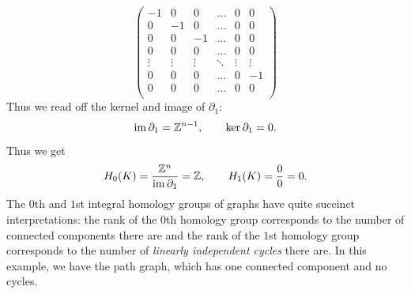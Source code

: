\begin{example}
\begin{enumerate}
\[\begin{pmatrix}
                      -1     & 0      & 0      & \ldots & 0      & 0      \\
                      0      & -1     & 0      & \ldots & 0      & 0      \\
                      0      & 0      & -1     & \ldots & 0      & 0      \\
                      0      & 0      & 0      & \ldots & 0      & 0      \\
                      \vdots & \vdots & \vdots & \ddots & \vdots & \vdots \\
                      0      & 0      & 0      & \ldots & 0      & -1     \\
                      0      & 0      & 0      & \ldots & 0      & 0      \\
                  \end{pmatrix}
              \]
              Thus we read off the kernel and image of $\partial_1$:
              \[ \operatorname{im}\partial_1 = \mathbb Z^{n-1}, \qquad \ker\partial_1 = 0. \]
              Thus we get
              \[ H_0(K) = \frac{\mathbb Z^n}{\operatorname{im}\partial_1} = \mathbb Z, \qquad
                  H_1(K) = \frac{0}{0} = 0. \]
              The $0$th and $1$st integral homology groups of graphs have quite succinct interpretations: the rank of the $0$th homology group corresponds to the number of connected components there are and the rank of the $1$st homology group corresponds to the number of \emph{linearly independent cycles} there are. In this example, we have the path graph, which has one connected component and no cycles.


\end{enumerate}
\end{example}
